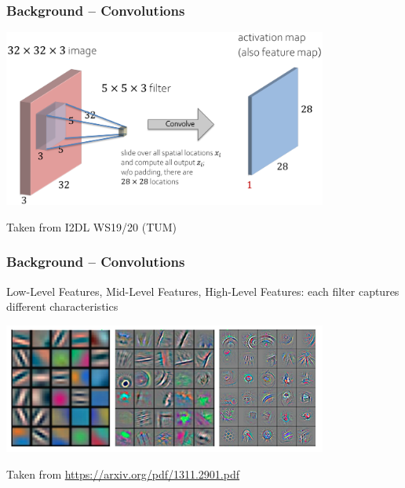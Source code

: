 \begin{frame}
    \frametitle{Background -- Convolutions}
\vspace*{5mm}
\includegraphics[width=0.8\textwidth, height=.55\textheight]{./Ressourcen/Praesentation/Bilder/conv_bsp.png}%

Taken from I2DL WS19/20 (TUM)
    
\end{frame}
\clearpage

\begin{frame}
    \frametitle{Background -- Convolutions}

Low-Level Features, Mid-Level Features, High-Level Features: each filter captures different characteristics

\includegraphics[width=0.8\textwidth, height=.55\textheight]{./Ressourcen/Praesentation/Bilder/features.png}%
\vspace*{-5mm}

Taken from \url{https://arxiv.org/pdf/1311.2901.pdf}   
    
\end{frame}
\clearpage